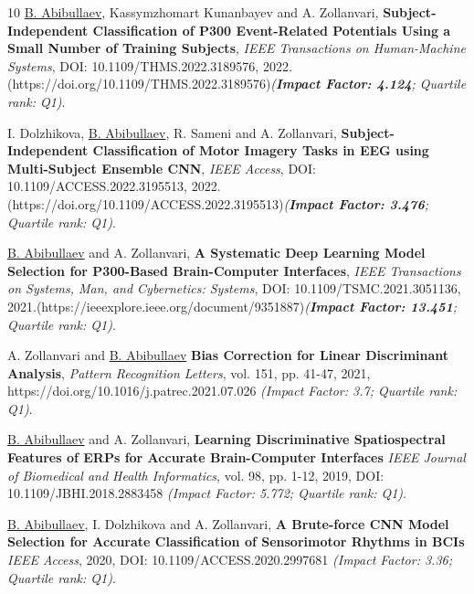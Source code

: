 \documentclass[10pt,letterpaper,sans]{moderncv}   %
\begin{document}
\vspace{12pt}
\renewcommand{\refname}{Refereed Journal Publications}  

\label{publication}
\begin{thebibliography}{10}
    \small 
    \underline{B. Abibullaev}, Kassymzhomart Kunanbayev and A. Zollanvari,
    \newblock \textbf{Subject-Independent Classification of P300 Event-Related Potentials Using a Small Number of Training Subjects},
    \newblock \textit{IEEE Transactions on Human-Machine Systems}, DOI: 10.1109/THMS.2022.3189576, 2022.(https://doi.org/10.1109/THMS.2022.3189576)\textit{(\textbf{Impact Factor: 4.124}; Quartile rank: Q1)}.

    \small 
    I. Dolzhikova, \underline{B. Abibullaev}, R. Sameni  and A. Zollanvari,
    \newblock \textbf{Subject-Independent Classification of Motor Imagery Tasks in EEG using Multi-Subject Ensemble CNN},
    \newblock \textit{IEEE Access}, DOI: 10.1109/ACCESS.2022.3195513, 2022.(https://doi.org/10.1109/ACCESS.2022.3195513)\textit{(\textbf{Impact Factor: 3.476}; Quartile rank: Q1)}.
    
    \small 
    \underline{B. Abibullaev} and A. Zollanvari,
    \newblock \textbf{A Systematic Deep Learning Model Selection for P300-Based Brain-Computer Interfaces},
    \newblock \textit{IEEE Transactions on Systems, Man, and Cybernetics: Systems}, DOI: 10.1109/TSMC.2021.3051136, 2021.(https://ieeexplore.ieee.org/document/9351887)\textit{(\textbf{Impact Factor: 13.451}; Quartile rank: Q1)}.

    \small 
    A. Zollanvari and \underline{B. Abibullaev}
    \newblock \textbf{Bias Correction for Linear Discriminant Analysis},
    \newblock \textit{Pattern Recognition Letters}, vol. 151, pp. 41-47, 2021, https://doi.org/10.1016/j.patrec.2021.07.026 \textit{(Impact Factor: 3.7; Quartile rank: Q1)}.
 
    \small 
    \underline{B. Abibullaev} and A. Zollanvari,
    \newblock \textbf{Learning Discriminative Spatiospectral Features of ERPs for Accurate Brain-Computer Interfaces}
    \newblock \textit{IEEE Journal of Biomedical and Health Informatics}, vol. 98, pp. 1-12, 2019, DOI: 10.1109/JBHI.2018.2883458 \textit{(Impact Factor: 5.772; Quartile rank: Q1)}.

    \small 
    \underline{B. Abibullaev}, I. Dolzhikova and A. Zollanvari, 
    \newblock \textbf{A Brute-force CNN Model Selection for Accurate Classification of Sensorimotor Rhythms in BCIs} \newblock \textit{IEEE Access}, 2020,  DOI: 10.1109/ACCESS.2020.2997681
    \textit{(Impact Factor: 3.36; Quartile rank: Q1)}.



\end{thebibliography}
\end{document}
